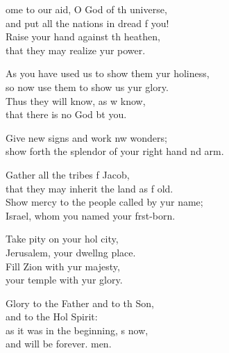 \begin{psalmverse}
  \begin{patverse}
ome to our aid, O God of th universe,\Med\\
and put all the nations in dread f you!\\
Raise your hand against th heathen,\Med\\
that they may realize yur power.

As you have used us to show them yur holiness,\Med\\
so now use them to show us yur glory.\\
Thus they will know, as w know,\Med\\
that there is no God bt you.

Give new signs and work nw wonders;\Med\\
show forth the splendor of your right hand nd arm.

Gather all the tribes f Jacob,\Med\\
that they may inherit the land as f old.\\
Show mercy to the people called by yur name;\Med\\
Israel, whom you named your f\pointup{\i}rst-born.

Take pity on your hol city,\Med\\
Jerusalem, your dwell\pointup{\i}ng place.\\
Fill Zion with yur majesty,\Med\\
your temple with yur glory.

Glory to the Father and to th Son,\Med\\
and to the Hol Spirit:\\
as it was in the beginning, \pointup{\i}s now,\Med\\
and will be forever. men. 
  \end{patverse}
\end{psalmverse}
